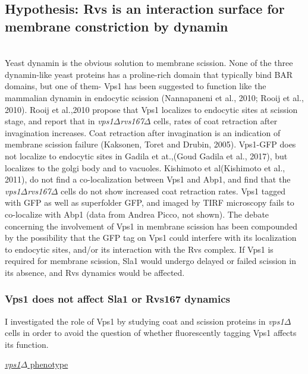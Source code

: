 \vspace{3mm}
\subsection{Hypothesis: Rvs is an interaction surface for membrane constriction by dynamin }
	\mbox{}\\
Yeast dynamin is the obvious solution to membrane scission. None of the three dynamin-like yeast proteins has a proline-rich domain that typically bind BAR domains, but one of them- Vps1 has been suggested to function like the mammalian dynamin in endocytic scission (Nannapaneni et al., 2010; Rooij et al., 2010). Rooij et al.,2010 propose that Vps1 localizes to endocytic sites at scission stage, and report that in \textit{vps1$\Delta$}\textit{rvs167$\Delta$} cells, rates of coat retraction after invagination increases. Coat retraction after invagination is an indication of membrane scission failure (Kaksonen, Toret and Drubin, 2005). Vps1-GFP does not localize to endocytic sites in Gadila et at.,(Goud Gadila et al., 2017), but localizes to the golgi body and to vacuoles. Kishimoto et al(Kishimoto et al., 2011), do not find a co-localization between Vps1 and Abp1, and find that the \textit{vps1$\Delta$}\textit{rvs167$\Delta$} cells do not show increased coat retraction rates. Vps1 tagged with GFP as well as superfolder GFP, and imaged by TIRF microscopy fails to co-localize with Abp1 (data from Andrea Picco, not shown). The debate concerning the involvement of Vps1 in membrane scission has been compounded by the possibility that the GFP tag on Vps1 could interfere with its localization to endocytic sites, and/or its interaction with the Rvs complex. If Vps1 is required for membrane scission, Sla1 would undergo delayed or failed scission in its absence, and Rvs dynamics would be affected. 



			\subsubsection{Vps1 does not affect Sla1 or Rvs167 dynamics }
I investigated the role of Vps1 by studying coat and scission proteins in \textit{vps1$\Delta$} cells in order to avoid the question of whether fluorescently tagging Vps1 affects its function. 
\vspace{5mm}

\underline{\textit{vps1$\Delta$} phenotype}

